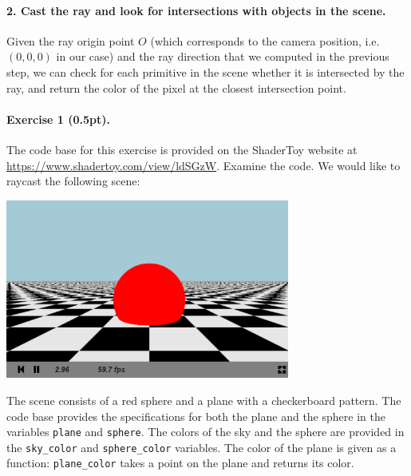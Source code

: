 \documentclass{article}
\newenvironment{exercise}[2]{\paragraph{Exercise #1 (#2pt).} }{
\medskip}
\begin{document}
\paragraph{2. Cast the ray and look for intersections with objects in the scene.} Given the ray origin point $O$ (which corresponds to the camera position, i.e. $(0, 0, 0)$ in our case) and the ray direction that we computed in the previous step, we can check for each primitive in the scene whether it is intersected by the ray, and return the color of the pixel at the closest intersection point.

\begin{exercise}{1}{0.5}
The code base for this exercise is provided on the ShaderToy website at \url{https://www.shadertoy.com/view/ldSGzW}. Examine the code. We would like to raycast the following scene:
\begin{center}
\includegraphics[width=0.7\textwidth]{raycasting.png}
\end{center}
The scene consists of a red sphere and a plane with a checkerboard pattern. The code base provides the specifications for both the plane and the sphere in the variables \texttt{plane} and \texttt{sphere}. The colors of the sky and the sphere are provided in the \verb#sky_color# and \verb#sphere_color# variables. The color of the plane is given as a function: \verb#plane_color# takes a point on the plane and returns its color.


\end{exercise}
\end{document}
